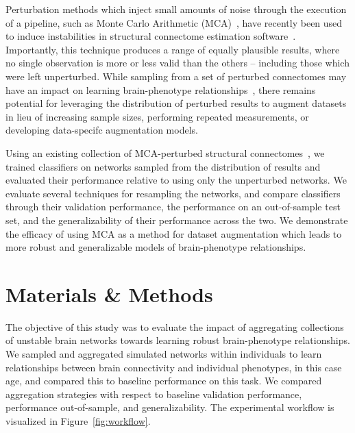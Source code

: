 \documentclass[10pt]{SelfArx} %
\newcommand{\new}[1]{\color{blue}#1\color{black}\xspace}
\begin{document}
Perturbation methods which inject small amounts of noise through the execution of a pipeline, such as Monte Carlo
Arithmetic (MCA)~\cite{Parker1997-qq,Denis2016-wo}, have recently been used to induce instabilities in structural
connectome estimation software~\cite{Kiar2020-lb}. Importantly, this technique produces a range of equally plausible
results, where no single observation is more or less valid than the others – including those which were left
unperturbed. While sampling from a set of perturbed connectomes may have an impact on learning brain-phenotype
relationships~\cite{Kiar2020-kz}, there remains potential for leveraging the distribution of perturbed results to
augment datasets in lieu of increasing sample sizes, performing repeated measurements, \new{or developing data-specifc
augmentation models}.

Using an existing collection of MCA-perturbed structural connectomes~\cite{Kiar2020-yz}, we trained classifiers on
networks sampled from the distribution of results and evaluated their performance relative to using only the
unperturbed networks. We evaluate several techniques for resampling the networks, and compare classifiers through their
validation performance, the performance on an out-of-sample test set, and the generalizability of their performance
across the two. We demonstrate the efficacy of using MCA as a method for dataset augmentation which leads to more
robust and generalizable models of brain-phenotype relationships.


\section*{Materials \& Methods}

The objective of this study was to evaluate the impact of aggregating collections of unstable brain networks towards
learning robust brain-phenotype relationships. We sampled and aggregated simulated networks within individuals to learn
relationships between brain connectivity and individual phenotypes, in this case age, and compared this to baseline
performance on this task. We compared aggregation strategies with respect to baseline validation performance,
performance out-of-sample, and generalizability. The experimental workflow is visualized in Figure~\ref{fig:workflow}.
\end{document}
